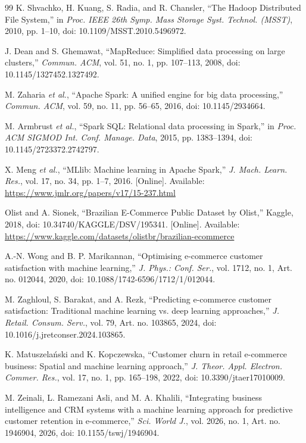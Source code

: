 \documentclass[11pt,a4paper]{article}
\begin{document}
\begin{thebibliography}{99}
 K. Shvachko, H. Kuang, S. Radia, and R. Chansler, ``The Hadoop
Distributed File System,'' in \emph{Proc. IEEE 26th Symp. Mass Storage Syst. Technol.
(MSST)}, 2010, pp. 1--10, doi: 10.1109/MSST.2010.5496972.

 J. Dean and S. Ghemawat, ``MapReduce: Simplified data processing on
large clusters,'' \emph{Commun. ACM}, vol. 51, no. 1, pp. 107--113, 2008,
doi: 10.1145/1327452.1327492.

 M. Zaharia \emph{et al.}, ``Apache Spark: A unified engine for big
data processing,'' \emph{Commun. ACM}, vol. 59, no. 11, pp. 56--65, 2016,
doi: 10.1145/2934664.

 M. Armbrust \emph{et al.}, ``Spark SQL: Relational data processing
in Spark,'' in \emph{Proc. ACM SIGMOD Int. Conf. Manage. Data}, 2015, pp. 1383--1394,
doi: 10.1145/2723372.2742797.

 X. Meng \emph{et al.}, ``MLlib: Machine learning in Apache Spark,''
\emph{J. Mach. Learn. Res.}, vol. 17, no. 34, pp. 1--7, 2016. [Online]. Available:
\url{https://www.jmlr.org/papers/v17/15-237.html}

 Olist and A. Sionek, ``Brazilian E-Commerce Public Dataset by Olist,''
Kaggle, 2018, doi: 10.34740/KAGGLE/DSV/195341. [Online]. Available:
\url{https://www.kaggle.com/datasets/olistbr/brazilian-ecommerce}

 A.-N. Wong and B. P. Marikannan, ``Optimising e-commerce customer
satisfaction with machine learning,'' \emph{J. Phys.: Conf. Ser.}, vol. 1712, no. 1,
Art. no. 012044, 2020, doi: 10.1088/1742-6596/1712/1/012044.

 M. Zaghloul, S. Barakat, and A. Rezk, ``Predicting e-commerce
customer satisfaction: Traditional machine learning vs. deep learning approaches,''
\emph{J. Retail. Consum. Serv.}, vol. 79, Art. no. 103865, 2024,
doi: 10.1016/j.jretconser.2024.103865.

 K. Matuszelański and K. Kopczewska, ``Customer churn in retail
e-commerce business: Spatial and machine learning approach,'' \emph{J. Theor. Appl.
Electron. Commer. Res.}, vol. 17, no. 1, pp. 165--198, 2022, doi: 10.3390/jtaer17010009.

 M. Zeinali, L. Ramezani Asli, and M. A. Khalili, ``Integrating
business intelligence and CRM systems with a machine learning approach for predictive
customer retention in e-commerce,'' \emph{Sci. World J.}, vol. 2026, no. 1,
Art. no. 1946904, 2026, doi: 10.1155/tswj/1946904.


\end{thebibliography}
\end{document}
